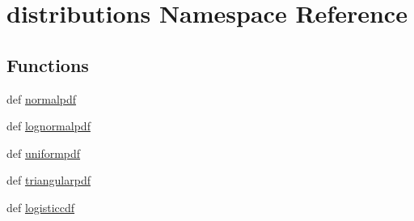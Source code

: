 \hypertarget{namespacedistributions}{\section{distributions Namespace Reference}
\label{namespacedistributions}
}
\subsection*{Functions}
\begin{DoxyCompactItemize}
\item 
def \hyperlink{namespacedistributions_ad0d6caee9c24d04ef21803377a717d0f}{normalpdf}
\item 
def \hyperlink{namespacedistributions_a984f05608d321d7250ded7cefca24373}{lognormalpdf}
\item 
def \hyperlink{namespacedistributions_aad1602f087b1d8d4f371c9e2e6b28737}{uniformpdf}
\item 
def \hyperlink{namespacedistributions_ad7f8f0237ecb0d7a72f3e8e1758cc45b}{triangularpdf}
\item 
def \hyperlink{namespacedistributions_a3115102cf0a305c104851f8e581ef7f2}{logisticcdf}
\end{DoxyCompactItemize}


